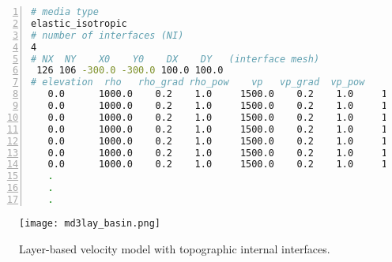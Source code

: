 \begin{lstlisting}[language=bash, caption=Example of .md3lay file,
   numbers=left, numbersep=5pt,numberstyle=\tiny\color{codegray}, commentstyle=\color{codegreen},
    label={lst_medium_md3lay},
   frame=tb]
# media type
elastic_isotropic
# number of interfaces (NI)
4
# NX  NY    X0    Y0    DX    DY   (interface mesh)
 126 106 -300.0 -300.0 100.0 100.0
# elevation  rho   rho_grad rho_pow    vp   vp_grad  vp_pow    vs    vs_grad  vs_pow
   0.0      1000.0    0.2    1.0     1500.0    0.2    1.0     1000.0    0.2    1.0
   0.0      1000.0    0.2    1.0     1500.0    0.2    1.0     1000.0    0.2    1.0
   0.0      1000.0    0.2    1.0     1500.0    0.2    1.0     1000.0    0.2    1.0
   0.0      1000.0    0.2    1.0     1500.0    0.2    1.0     1000.0    0.2    1.0
   0.0      1000.0    0.2    1.0     1500.0    0.2    1.0     1000.0    0.2    1.0
   0.0      1000.0    0.2    1.0     1500.0    0.2    1.0     1000.0    0.2    1.0
   0.0      1000.0    0.2    1.0     1500.0    0.2    1.0     1000.0    0.2    1.0
   .
   .
   .
\end{lstlisting}

\begin{figure}
    \centering
    \texttt{[image: md3lay\_basin.png]}
    \caption{Layer-based velocity model with topographic internal interfaces.}
    \label{fig_md3lay}
\end{figure}



